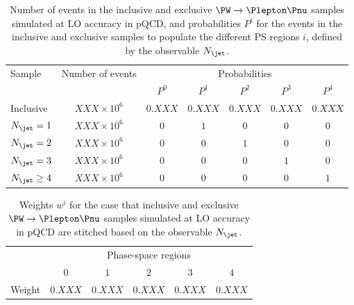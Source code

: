 \begin{table}[h!]
\begin{center}
\begin{tabular}{l|c|ccccc}
\hline
\multirow{2}{20mm}{Sample} & Number of events    & \multicolumn{5}{c}{Probabilities}               \\
                           &                     & $P^{0}$ & $P^{1}$ & $P^{2}$ & $P^{3}$ & $P^{4}$ \\
\hline
\hline
Inclusive                  & $XXX \times 10^{6}$ & $0.XXX$ & $0.XXX$ & $0.XXX$ & $0.XXX$ & $0.XXX$ \\
\hline
$N_{\jet} = 1$             & $XXX \times 10^{6}$ & $0$     & $1$     & $0$     & $0$     & $0$     \\
$N_{\jet} = 2$             & $XXX \times 10^{6}$ & $0$     & $0$     & $1$     & $0$     & $0$     \\
$N_{\jet} = 3$             & $XXX \times 10^{6}$ & $0$     & $0$     & $0$     & $1$     & $0$     \\
$N_{\jet} \geq 4$          & $XXX \times 10^{6}$ & $0$     & $0$     & $0$     & $0$     & $1$     \\
\hline
\end{tabular}
\end{center}
\caption{
  Number of events in the inclusive and exclusive $\PW \to \Plepton\Pnu$ samples simulated at LO accuracy in pQCD,
  and probabilities $P^{i}$ for the events in the inclusive and exclusive samples to populate the different PS regions $i$,
  defined by the observable $N_{\jet}$.
}
\label{tab:samples_and_probabilities_WJets_vs_Njet}
\end{table}

\begin{table}[h!]
\begin{center}
\begin{tabular}{l|ccccc}
\hline
 & \multicolumn{5}{c}{Phase-space regions} \\
 & $0$ & $1$ & $2$ & $3$ & $4$ \\
\hline
\hline
Weight & $0.XXX$ & $0.XXX$ & $0.XXX$ & $0.XXX$ & $0.XXX$ \\
\hline
\end{tabular}
\end{center}
\caption{
  Weights $w^{i}$ for the case that inclusive and exclusive $\PW \to \Plepton\Pnu$ samples simulated at LO accuracy in pQCD
  are stitched based on the observable $N_{\jet}$.
}
\label{tab:weights_WJets_vs_Njet}
\end{table}

